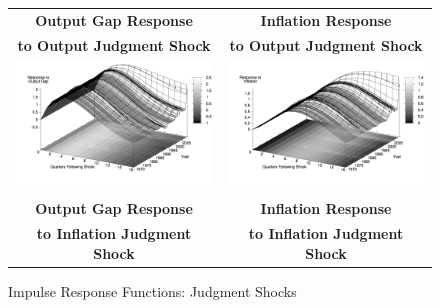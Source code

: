 \documentclass[10pt]{article}
\begin{document}
{\begin{figure}\caption{Impulse Response Functions: Judgment Shocks}\label{fg:irf_judgment}
\hspace*{-4pc}
\begin{tabular}{cc}\\
\textbf{Output Gap Response} & \textbf{Inflation Response} \\
\textbf{to Output Judgment Shock} & \textbf{to Output Judgment Shock}  \\
\includegraphics[scale=0.12]{images/Irf16_Output_Gap_Output_Judgment_Shock.png} & \includegraphics[scale=0.12]{images/Irf16_Inflation_Output_Judgment_Shock.png} \\\\
\textbf{Output Gap Response} & \textbf{Inflation Response} \\ 
\textbf{to Inflation Judgment Shock} & \textbf{to Inflation Judgment Shock}  \\

\end{tabular}
\end{figure}}
\end{document}

